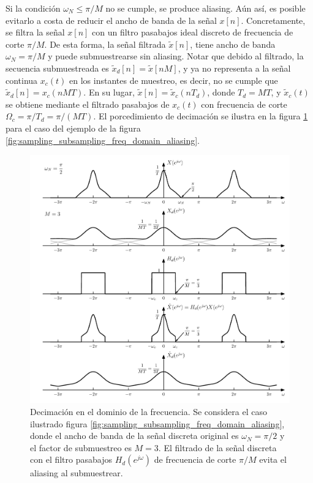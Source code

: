 \documentclass[a4paper]{report}
\begin{document}
Si la condición \(\omega_N\leq \pi/M\) no se cumple, se produce aliasing. Aún así, es posible evitarlo a costa de reducir el ancho de banda de la señal \(x[n]\). Concretamente, se filtra la señal \(x[n]\) con un filtro pasabajos ideal discreto de frecuencia de corte \(\pi/M\). De esta forma, la señal filtrada \(\tilde{x}[n]\), tiene ancho de banda \(\omega_N=\pi/M\) y puede submuestrearse sin aliasing. Notar que debido al filtrado, la secuencia submuestreada es \(\tilde{x}_d[n]=\tilde{x}[nM]\), y ya no representa a la señal continua \(x_c(t)\) en los instantes de muestreo, es decir, no se cumple que \(\tilde{x}_d[n]=x_c(nMT)\). En su lugar, \(\tilde{x}[n]=\tilde{x}_c(nT_d)\), donde \(T_d=MT\), y \(\tilde{x}_c(t)\) se obtiene mediante el filtrado pasabajos de \(x_c(t)\) con frecuencia de corte \(\Omega_c=\pi/T_d=\pi/(MT)\). El porcedimiento de decimación se ilustra en la figura \ref{fig:sampling_subsampling_freq_domain_decimation} para el caso del ejemplo de la figura \ref{fig:sampling_subsampling_freq_domain_aliasing}.
\begin{figure}[!htb]
 \begin{center}
 \includegraphics[width=1\textwidth]{figuras/sampling_subsampling_freq_domain_decimation.pdf}
 \caption{\label{fig:sampling_subsampling_freq_domain_decimation} Decimación en el dominio de la frecuencia. Se considera el caso ilustrado figura \ref{fig:sampling_subsampling_freq_domain_aliasing}, donde el ancho de banda de la señal discreta original es \(\omega_N=\pi/2\) y el factor de submuestreo es \(M=3\). El filtrado de la señal discreta con el filtro pasabajos \(H_d(e^{j\omega})\) de frecuencia de corte \(\pi/M\) evita el aliasing al submuestrear.}
 \end{center}
\end{figure}
\end{document}

